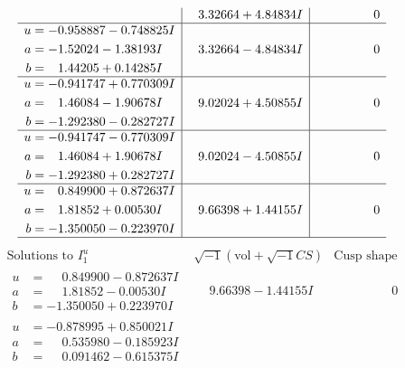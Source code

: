 \documentclass[1p]{elsarticle_modified}
\theoremstyle{definition}
\newcommand{\I}{\sqrt{-1}}
\begin{document}
$$\begin{array}{c|c|c}
 & \phantom{-}3.32664 + 4.84834 I & \phantom{-0.000000 } 0 \\ \hline\begin{aligned}
u &= -0.958887 - 0.748825 I \\
a &= -1.52024 - 1.38193 I \\
b &= \phantom{-}1.44205 + 0.14285 I\end{aligned}
 & \phantom{-}3.32664 - 4.84834 I & \phantom{-0.000000 } 0 \\ \hline\begin{aligned}
u &= -0.941747 + 0.770309 I \\
a &= \phantom{-}1.46084 - 1.90678 I \\
b &= -1.292380 - 0.282727 I\end{aligned}
 & \phantom{-}9.02024 + 4.50855 I & \phantom{-0.000000 } 0 \\ \hline\begin{aligned}
u &= -0.941747 - 0.770309 I \\
a &= \phantom{-}1.46084 + 1.90678 I \\
b &= -1.292380 + 0.282727 I\end{aligned}
 & \phantom{-}9.02024 - 4.50855 I & \phantom{-0.000000 } 0 \\ \hline\begin{aligned}
u &= \phantom{-}0.849900 + 0.872637 I \\
a &= \phantom{-}1.81852 + 0.00530 I \\
b &= -1.350050 - 0.223970 I\end{aligned}
 & \phantom{-}9.66398 + 1.44155 I & \phantom{-0.000000 } 0\\
 \hline 
 \end{array}$$\newpage$$\begin{array}{c|c|c}  
\text{Solutions to }I^u_{1}& \I (\text{vol} + \sqrt{-1}CS) & \text{Cusp shape}\\
 \hline 
\begin{aligned}
u &= \phantom{-}0.849900 - 0.872637 I \\
a &= \phantom{-}1.81852 - 0.00530 I \\
b &= -1.350050 + 0.223970 I\end{aligned}
 & \phantom{-}9.66398 - 1.44155 I & \phantom{-0.000000 } 0 \\ \hline\begin{aligned}
u &= -0.878995 + 0.850021 I \\
a &= \phantom{-}0.535980 - 0.185923 I \\
b &= \phantom{-}0.091462 - 0.615375 I\end{aligned}

\end{array}$$
\end{document}
